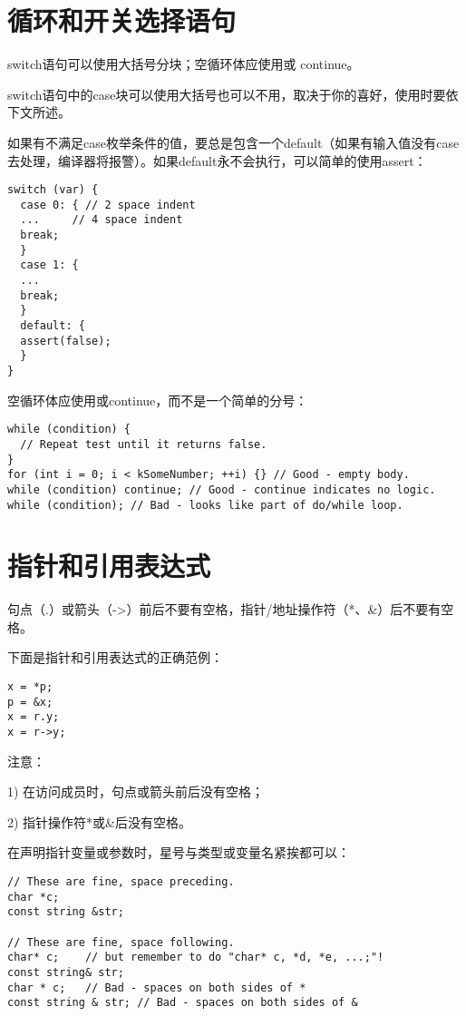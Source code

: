 \section{循环和开关选择语句}
switch语句可以使用大括号分块；空循环体应使用{}或 continue。

switch语句中的case块可以使用大括号也可以不用，取决于你的喜好，使用时要依下文所述。

如果有不满足case枚举条件的值，要总是包含一个default（如果有输入值没有case去处理，编译器将报警）。如果default永不会执行，可以简单的使用assert：
\begin{verbatim}
switch (var) {
  case 0: { // 2 space indent
  ...     // 4 space indent
  break;
  }
  case 1: {
  ...
  break;
  }
  default: {
  assert(false);
  }
}
\end{verbatim}

空循环体应使用{}或continue，而不是一个简单的分号：
\begin{verbatim}
while (condition) {
  // Repeat test until it returns false.
}
for (int i = 0; i < kSomeNumber; ++i) {} // Good - empty body.
while (condition) continue; // Good - continue indicates no logic.
while (condition); // Bad - looks like part of do/while loop.
\end{verbatim}


\section{指针和引用表达式}
句点（.）或箭头（->）前后不要有空格，指针/地址操作符（*、\&）后不要有空格。

下面是指针和引用表达式的正确范例：
\begin{verbatim}
x = *p;
p = &x;
x = r.y;
x = r->y;
\end{verbatim}

注意：

1) 在访问成员时，句点或箭头前后没有空格；

2) 指针操作符*或\&后没有空格。

在声明指针变量或参数时，星号与类型或变量名紧挨都可以：
\begin{verbatim}
// These are fine, space preceding.
char *c;
const string &str;

// These are fine, space following.
char* c;    // but remember to do "char* c, *d, *e, ...;"!
const string& str;
char * c;   // Bad - spaces on both sides of *
const string & str; // Bad - spaces on both sides of &
\end{verbatim}


